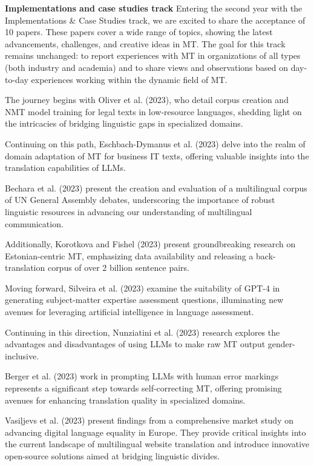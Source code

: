 {\bf Implementations and case studies track}
Entering the second year with the Implementations \& Case Studies track, we are excited to share the acceptance of 10 papers. These papers cover a wide range of topics, showing the latest advancements, challenges, and creative ideas in MT. The goal for this track remains unchanged: to report experiences with MT in organizations of all types (both industry and academia) and to share views and observations based on day-to-day experiences working within the dynamic field of MT.

The journey begins with Oliver et al. (2023), who detail corpus creation and NMT model training for legal texts in low-resource languages, shedding light on the intricacies of bridging linguistic gaps in specialized domains.

Continuing on this path, Eschbach-Dymanus et al. (2023) delve into the realm of domain adaptation of MT for business IT texts, offering valuable insights into the translation capabilities of LLMs.

Bechara et al. (2023) present the creation and evaluation of a multilingual corpus of UN General Assembly debates, underscoring the importance of robust linguistic resources in advancing our understanding of multilingual communication.

Additionally, Korotkova and Fishel (2023) present groundbreaking research on Estonian-centric MT, emphasizing data availability and releasing a back-translation corpus of over 2 billion sentence pairs.

Moving forward, Silveira et al. (2023) examine the suitability of GPT-4 in generating subject-matter expertise assessment questions, illuminating new avenues for leveraging artificial intelligence in language assessment.

Continuing in this direction, Nunziatini et al. (2023) research explores the advantages and disadvantages of using LLMs to make raw MT output gender-inclusive.

Berger et al. (2023) work in prompting LLMs with human error markings represents a significant step towards self-correcting MT, offering promising avenues for enhancing translation quality in specialized domains.

Vasiļjevs et al. (2023) present findings from a comprehensive market study on advancing digital language equality in Europe. They provide critical insights into the current landscape of multilingual website translation and introduce innovative open-source solutions aimed at bridging linguistic divides.

